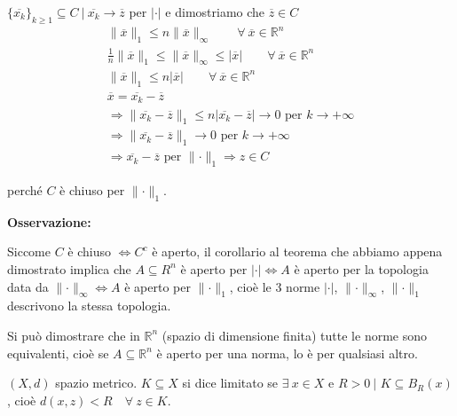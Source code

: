 \begin{exbar}
\begin{example}
\begin{itemize}
		$\{ \overline{x_k}\}_{k \geq 1} \subseteq C \ \big| \ \overline{x_k} \rightarrow \overline{z}$ per $|\cdot|$ e dimostriamo che $\overline{z} \in C$ 
		\begin{gather*}
			\parallel \overline{x} \parallel_1 \leq n \parallel \overline{x} \parallel_\infty \qquad \forall \ \overline{x} \in \mathbb{R}^n
			\\
			\frac{1}{n} \parallel \overline{x} \parallel_1 \leq \parallel \overline{x}\parallel_\infty \leq |\overline{x}| \qquad \forall \ \overline{x} \in \mathbb{R}^n
			\\
			\parallel \overline{x} \parallel_1 \leq n |\overline{x}| \qquad \forall \ \overline{x} \in \mathbb{R}^n
			\\
			\overline{x} = \overline{x_k} - \overline{z}
			\\
			\Rightarrow \parallel \overline{x_k} - \overline{z} \parallel_1 \leq n |\overline{x_k} - \overline{z}| \rightarrow 0 \text{ per } k \rightarrow +\infty
			\\
			\Rightarrow \parallel \overline{x_k} - \overline{z} \parallel_1 \rightarrow 0 \text{ per } k \rightarrow +\infty
			\\
			\Rightarrow \overline{x_k} - \overline{z} \text{ per } \parallel \cdot \parallel_1 \Rightarrow z \in C
		\end{gather*}
		
		perché $C$ è chiuso per $\parallel \cdot \parallel_1$.
	\end{itemize}
\end{example}
\end{exbar}


\textbf{Osservazione:}

Siccome $C$ è chiuso $\iff C^c$ è aperto, il corollario al teorema che abbiamo appena dimostrato implica che $A \subseteq R^n$ è aperto per $|\cdot|  \iff A $ è aperto per la topologia data da $\parallel \cdot \parallel_\infty \iff A$ è aperto per $\parallel \cdot \parallel_1$, cioè le 3 norme $|\cdot|$, $\parallel \cdot \parallel_\infty$, $\parallel \cdot \parallel_1$ descrivono la stessa topologia.

\begin{attbar}
	Si può dimostrare che in $\mathbb{R}^n$ (spazio di dimensione finita) tutte le norme sono equivalenti, cioè se $A \subseteq \mathbb{R}^n$ è aperto per una norma, lo è per qualsiasi altro.
\end{attbar}


\begin{definition}
	$(X,d)$ spazio metrico. $K \subseteq X$ si dice limitato se $\exists \ x \in X$ e $R>0 \ \big|$ $K \subseteq B_R(x)$, cioè $d(x,z) < R \quad \forall \ z \in K$. 
\end{definition}


